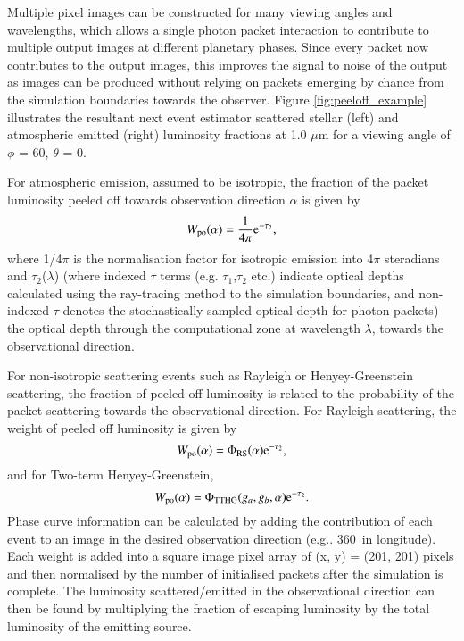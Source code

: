\documentclass{aa}
\begin{document}
Multiple pixel images can be constructed for many viewing angles and wavelengths, which allows a single photon packet interaction to contribute to multiple output images at different planetary phases.
Since every packet now contributes to the output images, this improves the signal to noise of the output as images can be produced without relying on packets emerging by chance from the simulation boundaries towards the observer.
Figure \ref{fig:peeloff_example} illustrates the resultant next event estimator scattered stellar (left) and atmospheric emitted (right) luminosity fractions  at 1.0 $\mu$m for a viewing angle of $\phi$ = 60\degr, $\theta$ = 0\degr.

For atmospheric emission, assumed to be isotropic, the fraction of the packet luminosity peeled off towards observation direction $\alpha$ is given by
\begin{equation}
W_{\rm po}(\alpha) = \frac{1}{4\pi}\rm{e}^{-\tau_{2}},
\label{eq:w_em}
\end{equation}
where 1/4$\pi$ is the normalisation factor for isotropic emission into 4$\pi$ steradians and $\tau_{2}$($\lambda$) (where indexed $\tau$ terms (e.g. $\tau_{1}$,$\tau_{2}$ etc.) indicate optical depths calculated using the ray-tracing method to the simulation boundaries, and non-indexed $\tau$ denotes the stochastically sampled optical depth for photon packets) the optical depth through the computational zone at wavelength $\lambda$, towards the observational direction.

For non-isotropic scattering events such as Rayleigh or Henyey-Greenstein scattering, the fraction of peeled off luminosity is related to the probability of the packet scattering towards the observational direction.
For Rayleigh scattering, the weight of peeled off luminosity is given by
\begin{equation}
W_{\rm po}(\alpha) = \Phi_{\rm RS}(\alpha) \rm{e}^{-\tau_{2}},
\end{equation}
and for Two-term Henyey-Greenstein, 
\begin{equation}
W_{\rm po}(\alpha) = \Phi_{\rm TTHG}(g_{a},g_{b}, \alpha)\rm{e}^{-\tau_{2}}.
\end{equation}
Phase curve information can be calculated by adding the contribution of each event to an image in the desired observation direction (e.g.. 360\degr\ in longitude).
Each weight is added into a square image pixel array of (x, y) = (201, 201) pixels and then normalised by the number of initialised packets after the simulation is complete.
The luminosity scattered/emitted in the observational direction can then be found by multiplying the fraction of escaping luminosity by the total luminosity of the emitting source.
\end{document}
